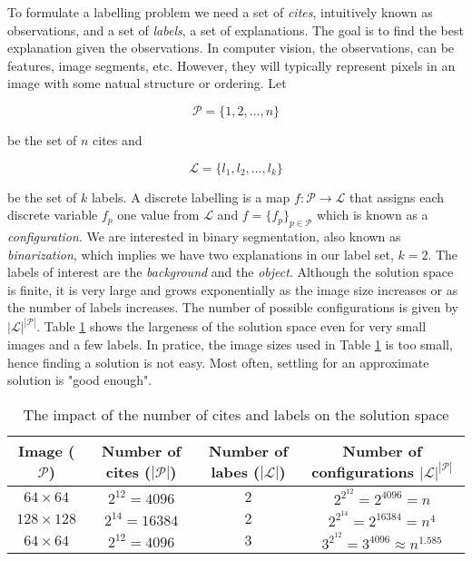 To formulate a labelling problem we need a set of \textit{cites}, intuitively known as observations, and a set of \textit{labels}, a set of explanations.
The goal is to find the best explanation given the observations.
In computer vision, the observations, can be features, image segments, etc.
However, they will typically represent pixels in an image with some natual structure or ordering.
Let 

\begin{equation*}
	\mathcal{P} = \{1, 2, \ldots, n\}
\end{equation*}

be the set of $n$ cites and 

\begin{equation*}
\mathcal{L} = \{l_1, l_2, \ldots, l_k\}
\end{equation*}

be the set of $k$ labels.
A discrete labelling is a map $f: \mathcal{P} \rightarrow \mathcal{L}$ that assigns each discrete variable $f_p$ one value from $\mathcal{L}$ and $f=\{f_p\}_{p \in \mathcal{P}}$ which is known as a \textit{configuration}.
We are interested in binary segmentation, also known as \textit{binarization}, which implies we have two explanations in our label set, $k=2$.
The labels of interest are the \textit{background} and the \textit{object}.
Although the solution space is finite, it is very large and grows exponentially as the image size increases or as the number of labels increases.
The number of possible configurations is given by $|\mathcal{L}|^{|\mathcal{P}|}$.
Table \ref{tab:configuration} shows the largeness of the solution space even for very small images and a few labels.
In pratice, the image sizes used in Table \ref{tab:configuration} is too small, hence finding a solution is not easy.
Most often, settling for an approximate solution is "good enough".

\def\arraystretch{1.2}
\begin{table}[ht]
	\caption{The impact of the number of cites and labels on the solution space}
	\label{tab:configuration}
	\begin{tabular}{|c|c|c|c|}
		\hline 
		Image ($\mathcal{P}$) & Number of cites ($|\mathcal{P}|$) & Number of labes ($|\mathcal{L}|$) & Number of configurations $|\mathcal{L}|^{|\mathcal{P}|}$ \\ 
		\hline 
		$64 \times 64$ & $2^{12}=4096$ & $2$ & $2^{2^{12}} = 2^{4096}=n$ \\
		\hline 
		$128 \times 128$ & $2^{14}=16384$ & $2$ & $2^{2^{14}} = 2^{16384} = n^4$ \\ 
		\hline 
		$64 \times 64$ & $2^{12}=4096$ & $3$ & $3^{2^{12}} = 3^{4096} \approx n^{1.585}$ \\ 
		\hline 
	\end{tabular}
\end{table}
 

